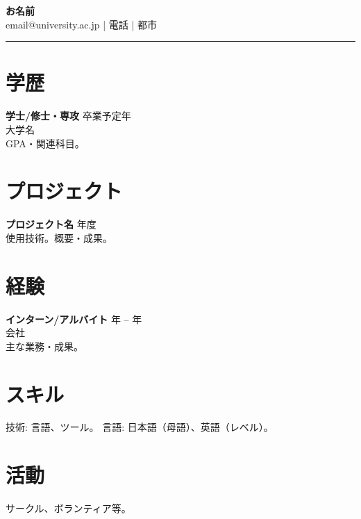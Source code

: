 \documentclass[11pt,a4paper]{article}
\begin{document}
\begin{center}
{\LARGE \textbf{お名前}}\\[0.2em]
email@university.ac.jp \quad | \quad 電話 \quad | \quad 都市
\end{center}
\begin{flushright}\rule{2cm}{2.5cm}\end{flushright}
\vspace{0.4em}
\section*{学歴}
\textbf{学士/修士・専攻} \hfill 卒業予定年 \\
大学名 \\
GPA・関連科目。
\section*{プロジェクト}
\textbf{プロジェクト名} \hfill 年度 \\
使用技術。概要・成果。
\section*{経験}
\textbf{インターン/アルバイト} \hfill 年 -- 年 \\
会社 \\
主な業務・成果。
\section*{スキル}
技術: 言語、ツール。 \quad 言語: 日本語（母語）、英語（レベル）。
\section*{活動}
サークル、ボランティア等。
\end{document}
